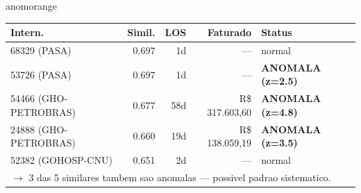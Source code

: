 \documentclass[a4paper,10pt]{article}
\begin{document}
\begin{anomalycard}[Internacao 118284 | GHO-BRADESCO | ALTO (z=3.20)]{anomorange}
\begin{tabular}{l r r r l}\toprule\textbf{Intern.} & \textbf{Simil.} & \textbf{LOS} & \textbf{Faturado} & \textbf{Status} \\\midrule
68329 (PASA) & 0.697 & 1d & --- & \textcolor{jcubeblue}{normal} \\
53726 (PASA) & 0.697 & 1d & --- & \textcolor{anomred}{\textbf{ANOMALA (z=2.5)}} \\
54466 (GHO-PETROBRAS) & 0.677 & 58d & R\$ 317.603,60 & \textcolor{anomred}{\textbf{ANOMALA (z=4.8)}} \\
24888 (GHO-PETROBRAS) & 0.660 & 19d & R\$ 138.059,19 & \textcolor{anomred}{\textbf{ANOMALA (z=3.5)}} \\
52382 (GOHOSP-CNU) & 0.651 & 2d & --- & \textcolor{jcubeblue}{normal} \\
\multicolumn{5}{l}{\textcolor{anomred}{\small $\rightarrow$ 3 das 5 similares tambem sao anomalas --- possivel padrao sistematico.}} \\
\bottomrule\end{tabular}


\end{anomalycard}

\newpage
\end{document}
